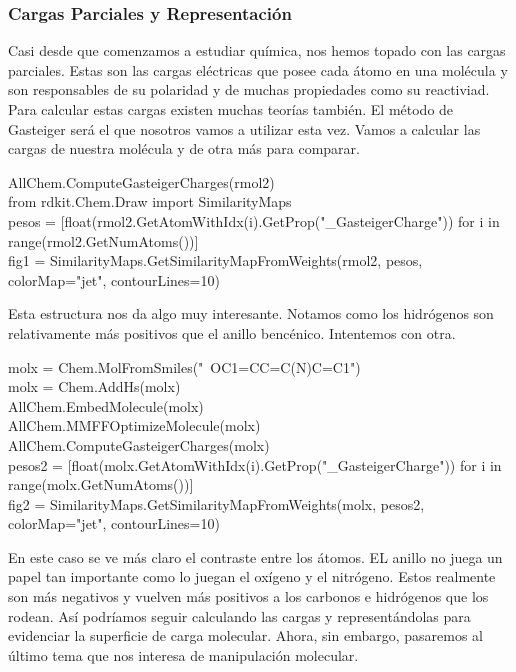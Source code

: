 \documentclass[10pt,letterpaper]{article}
\newenvironment{Code}
{
\begin{lrbox}{\selvestebox}%
\begin{minipage}{\dimexpr\columnwidth-2\fboxsep\relax}
\fontfamily{\ttdefault}\selectfont
}
{\end{minipage}\end{lrbox}%
\begin{center}
\colorbox{light-gray}{\usebox{\selvestebox}}
\end{center}
}
\begin{document}
\subsubsection{Cargas Parciales y Representaci\'on}

Casi desde que comenzamos a estudiar qu\'imica, nos hemos topado con las cargas parciales. Estas son las cargas el\'ectricas que posee cada \'atomo en una mol\'ecula y son responsables de su polaridad y de muchas propiedades como su reactiviad. Para calcular estas cargas existen muchas teor\'ias tambi\'en. El m\'etodo de Gasteiger ser\'a el que nosotros vamos a utilizar esta vez. Vamos a calcular las cargas de nuestra mol\'ecula y de otra m\'as para comparar.

\begin{Code}
AllChem.ComputeGasteigerCharges(rmol2)\\
from rdkit.Chem.Draw import SimilarityMaps\\
pesos = [float(rmol2.GetAtomWithIdx(i).GetProp("\_GasteigerCharge")) for i in range(rmol2.GetNumAtoms())]\\
fig1 = SimilarityMaps.GetSimilarityMapFromWeights(rmol2, pesos, colorMap="jet", contourLines=10)
\end{Code}

Esta estructura nos da algo muy interesante. Notamos como los hidr\'ogenos son relativamente m\'as positivos que el anillo benc\'enico. Intentemos con otra.

\begin{Code}
molx = Chem.MolFromSmiles("\ \hspace*{-2mm}OC1=CC=C(N)C=C1")\\
molx = Chem.AddHs(molx)\\
AllChem.EmbedMolecule(molx)\\
AllChem.MMFFOptimizeMolecule(molx)\\
AllChem.ComputeGasteigerCharges(molx)\\
pesos2 = [float(molx.GetAtomWithIdx(i).GetProp("\_GasteigerCharge")) for i in range(molx.GetNumAtoms())]\\
fig2 = SimilarityMaps.GetSimilarityMapFromWeights(molx, pesos2, colorMap="jet", contourLines=10)
\end{Code}

En este caso se ve m\'as claro el contraste entre los \'atomos. EL anillo no juega un papel tan importante como lo juegan el ox\'igeno y el nitr\'ogeno. Estos realmente son m\'as negativos y vuelven m\'as positivos a los carbonos e hidr\'ogenos que los rodean. As\'i podr\'iamos seguir calculando las cargas y represent\'andolas para evidenciar la superficie de carga molecular. Ahora, sin embargo, pasaremos al \'ultimo tema que nos interesa de manipulaci\'on molecular.
\end{document}
